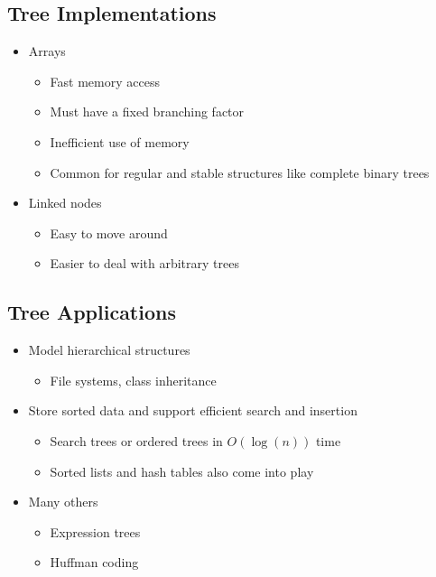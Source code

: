 \documentclass[10pt]{article}
\begin{document}
\subsection*{Tree Implementations}
\begin{itemize}
    \item Arrays
    \begin{itemize}
        \item Fast memory access
        \item Must have a fixed branching factor
        \item Inefficient use of memory
        \item Common for regular and stable structures like complete binary trees
    \end{itemize}
    \item Linked nodes
    \begin{itemize}
        \item Easy to move around
        \item Easier to deal with arbitrary trees
    \end{itemize}
\end{itemize}

\subsection*{Tree Applications}
\begin{itemize}
    \item Model hierarchical structures
    \begin{itemize}
        \item File systems, class inheritance
    \end{itemize}
    \item Store sorted data and support efficient search and insertion
    \begin{itemize}
        \item Search trees or ordered trees in $O(\log (n))$ time
        \item Sorted lists and hash tables also come into play
    \end{itemize}
    \item Many others
    \begin{itemize}
        \item Expression trees
        \item Huffman coding
    \end{itemize}
\end{itemize}
\end{document}
